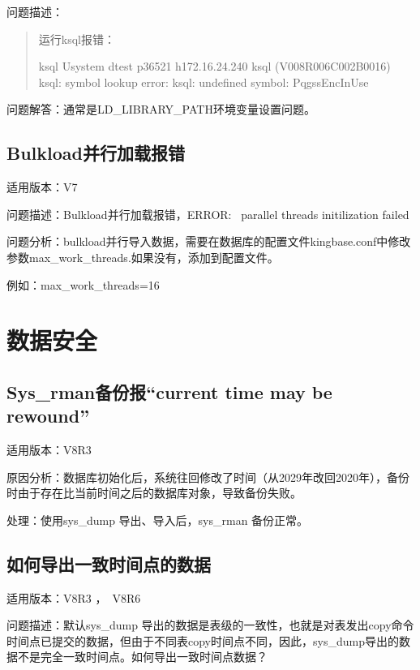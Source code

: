 \documentclass[a4,10pt,oneside,english]{sphinxmanual}
\begin{document}
问题描述：
\begin{quote}

运行ksql报错：

\begin{sphinxVerbatim}[commandchars=\\\{\}]
\PYGZdl{} ksql \PYGZhy{}Usystem \PYGZhy{}dtest \PYGZhy{}p36521 \PYGZhy{}h172.16.24.240
ksql (V008R006C002B0016)
ksql: symbol lookup error: ksql: undefined symbol: PqgssEncInUse
\end{sphinxVerbatim}
\end{quote}

问题解答：通常是LD\_LIBRARY\_PATH环境变量设置问题。


\section{Bulkload并行加载报错}
\label{\detokenize{tools:bulkload}}
适用版本：V7

问题描述：Bulkload并行加载报错，ERROR:  parallel threads initilization failed

问题分析：bulkload并行导入数据，需要在数据库的配置文件kingbase.conf中修改参数max\_work\_threads.如果没有，添加到配置文件。

例如：max\_work\_threads=16


\chapter{数据安全}
\label{\detokenize{data-security:id1}}\label{\detokenize{data-security::doc}}

\section{Sys\_rman备份报“current time may be rewound”}
\label{\detokenize{data-security:sys-rmancurrent-time-may-be-rewound}}
适用版本：V8R3

原因分析：数据库初始化后，系统往回修改了时间（从2029年改回2020年），备份时由于存在比当前时间之后的数据库对象，导致备份失败。

处理：使用sys\_dump 导出、导入后，sys\_rman 备份正常。


\section{如何导出一致时间点的数据}
\label{\detokenize{data-security:id2}}
适用版本：V8R3 ， V8R6

问题描述：默认sys\_dump 导出的数据是表级的一致性，也就是对表发出copy命令时间点已提交的数据，但由于不同表copy时间点不同，因此，sys\_dump导出的数据不是完全一致时间点。如何导出一致时间点数据？
\end{document}
